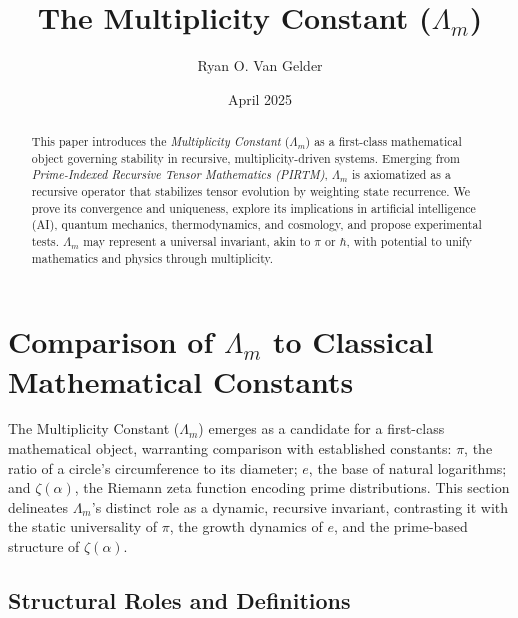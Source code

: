 \documentclass{article}
\theoremstyle{plain}
\begin{document}
\title{The Multiplicity Constant ($\Lambda_m$)}

\author{Ryan O. Van Gelder}
\date{April 2025}

\maketitle
\nolinenumbers

\begin{abstract}
This paper introduces the \textit{Multiplicity Constant} ($\Lambda_m$) as a first-class mathematical object governing stability in recursive, multiplicity-driven systems. Emerging from \textit{Prime-Indexed Recursive Tensor Mathematics (PIRTM)}, $\Lambda_m$ is axiomatized as a recursive operator that stabilizes tensor evolution by weighting state recurrence. We prove its convergence and uniqueness, explore its implications in artificial intelligence (AI), quantum mechanics, thermodynamics, and cosmology, and propose experimental tests. $\Lambda_m$ may represent a universal invariant, akin to $\pi$ or $\hbar$, with potential to unify mathematics and physics through multiplicity.
\end{abstract}

\section{Comparison of \(\Lambda_m\) to Classical Mathematical Constants}

The Multiplicity Constant (\(\Lambda_m\)) emerges as a candidate for a first-class mathematical object, warranting comparison with established constants: \(\pi\), the ratio of a circle's circumference to its diameter; \(e\), the base of natural logarithms; and \(\zeta(\alpha)\), the Riemann zeta function encoding prime distributions. This section delineates \(\Lambda_m\)'s distinct role as a dynamic, recursive invariant, contrasting it with the static universality of \(\pi\), the growth dynamics of \(e\), and the prime-based structure of \(\zeta(\alpha)\).

\subsection{Structural Roles and Definitions}
\end{document}
